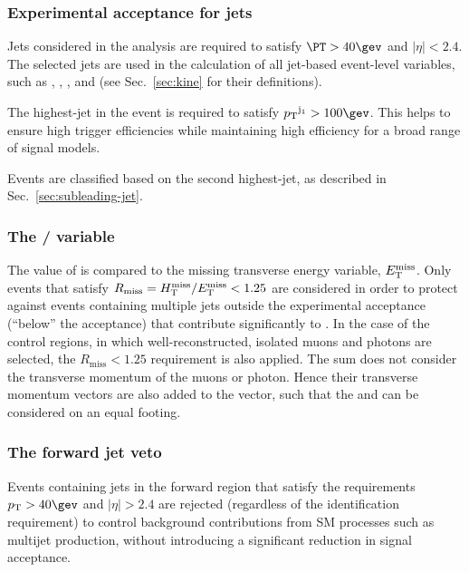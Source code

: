 \subsubsection{Experimental acceptance for jets}
\label{sec:jetsacc}

Jets considered in the analysis are required to satisfy $\PT > 40\gev$
and $|\eta| < 2.4$. The selected jets are used in the calculation of
all jet-based event-level variables, such as \njet, \HT, \mht, and
\alphat (see Sec.~\ref{sec:kine} for their definitions).

The highest-\Pt jet in the event is required to satisfy $\Pt^{\mathrm
  j_1} > 100\gev$. This helps to ensure high trigger efficiencies
while maintaining high efficiency for a broad range of signal models.

Events are classified based on the second highest-\Pt jet, as
described in Sec.~\ref{sec:subleading-jet}.

\subsubsection{The \texorpdfstring{\mht/\met}{HTmiss/ETmiss} variable} 
\label{sec:mhtmet}

The value of \mht is compared to the missing transverse energy
variable, $\mbox{$E_\text{T}^{\rm miss}$}$. Only events that satisfy
$R_{\mathrm{miss}}=\mbox{$H_{\rm T}^{\rm miss}$}/\mbox{$E_\text{T}^{\rm miss}$} < 1.25$ are considered in order to
protect against events containing multiple jets outside the
experimental acceptance (\eg ``below'' the \Pt acceptance) that
contribute significantly to \mht. In the case of the control regions,
in which well-reconstructed, isolated muons and photons are selected,
the $R_{\mathrm{miss}} < 1.25$ requirement is also applied. The \mht
sum does not consider the transverse momentum of the muons or
photon. Hence their transverse momentum vectors are also added to the
\met vector, such that the \mht and \met can be considered on an equal
footing.

\subsubsection{The forward jet veto} 

Events containing jets in the forward region that satisfy the
requirements $\Pt > 40\gev$ and $|\eta|>2.4$ are rejected (regardless
of the identification requirement) to control background contributions
from SM processes such as multijet production, without introducing a
significant reduction in signal acceptance.

